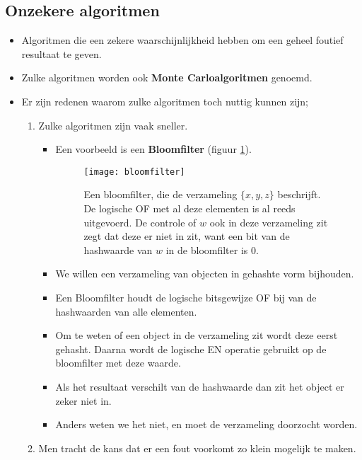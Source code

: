 \subsection{Onzekere algoritmen}
\begin{itemize}
    \item Algoritmen die een zekere waarschijnlijkheid hebben om een geheel foutief resultaat te geven.
    \item Zulke algoritmen worden ook \textbf{Monte Carloalgoritmen} genoemd.
    \item Er zijn redenen waarom zulke algoritmen toch nuttig kunnen zijn;
    \begin{enumerate}
        \item Zulke algoritmen zijn vaak sneller.
        \begin{itemize}
            \item Een voorbeeld is een \textbf{Bloomfilter} (figuur \ref{fig:bloomfilter}).
            \begin{figure}[ht]
                \centering
                \texttt{[image: bloomfilter]}
                \caption{Een bloomfilter, die de verzameling $\{x, y, z\}$ beschrijft. De logische OF met al deze elementen is al reeds uitgevoerd. De controle of $w$ ook in deze verzameling zit zegt dat deze er niet in zit, want een bit van de hashwaarde van $w$ in de bloomfilter is 0.}
                \label{fig:bloomfilter}
            \end{figure}
            \item We willen een verzameling van objecten in gehashte vorm bijhouden.
            \item Een Bloomfilter houdt de logische bitsgewijze OF bij van de hashwaarden van alle elementen.
            \item Om te weten of een object in de verzameling zit wordt deze eerst gehasht. Daarna wordt de logische EN operatie gebruikt op de bloomfilter met deze waarde.
            \item Als het resultaat verschilt van de hashwaarde dan zit het object er zeker niet in.
            \item Anders weten we het niet, en moet de verzameling doorzocht worden.
        \end{itemize}
        \item Men tracht de kans dat er een fout voorkomt zo klein mogelijk te maken.
    \end{enumerate}
\end{itemize}



